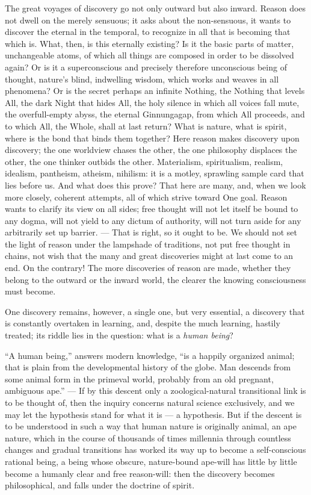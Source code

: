 \documentclass[12pt,a4paper,openany]{book}
\newcommand{\opage}[1]{\marginnote{\footnotesize\textit{[#1]}}}
\begin{document}
The great voyages of discovery go not only outward but also inward. Reason does not dwell on the merely sensuous; it asks
about the non-sensuous, it wants to discover the eternal in the temporal, to recognize in all that is becoming that which
is. What, then, is this eternally existing? Is it the basic parts of matter, unchangeable atoms, of which all things are
composed in order to be dissolved again? Or is it a superconscious and precisely therefore unconscious being of thought,
nature's blind, indwelling wisdom, which works and weaves in all phenomena? Or is the secret perhaps an infinite Nothing,
the Nothing that levels All, the dark Night that hides All, the holy silence in which all voices fall mute, the overfull-empty
abyss, the eternal Ginnungagap, from which All proceeds, and to which All, the Whole, shall at last return? What is nature,
what is spirit, where is the bond that binds them together? Here reason makes discovery upon discovery; the one worldview
chases the other, the
\setcounter{footnote}{0}%
\opage{36}one philosophy displaces the other, the one thinker outbids the other. Materialism, spiritualism, realism, idealism,
pantheism, atheism, nihilism: it is a motley, sprawling sample card that lies before us. And what does this prove? That here
are many, and, when we look more closely, coherent attempts, all of which strive toward One goal. Reason wants to clarify its
view on all sides; free thought will not let itself be bound to any dogma, will not yield to any dictum of authority, will not
turn aside for any arbitrarily set up barrier. --- That is right, so it ought to be. We should not set the light of reason
under the lampshade of traditions, not put free thought in chains, not wish that the many and great discoveries might at last
come to an end. On the contrary! The more discoveries of reason are made, whether they belong to the outward or the inward
world, the clearer the knowing consciousness must become.

One discovery remains, however, a single one, but very essential, a discovery that is constantly overtaken in learning, and,
despite the much learning, hastily treated; its riddle lies in the question: what is a \emph{human being}?

``A human being,'' answers modern knowledge, ``is a happily organized animal; that is plain from the developmental history of
the globe. Man descends from some animal form in the primeval world, probably from an old pregnant, ambiguous ape.'' ---
If by this descent only a zoological-natural transitional link is to be thought of, then the inquiry concerns natural science
exclusively, and we may let the hypothesis stand for what it is --- a hypothesis. But if the descent is to be understood in
such a way that human nature is originally animal, an ape nature, which in the course of thousands of times millennia through
countless changes and gradual transitions has worked its way up to become a self-conscious rational being, a being whose
obscure, nature-bound ape-will has little by little become a humanly clear and free reason-will: then the discovery becomes
philosophical, and falls under the doctrine of spirit.
\end{document}
